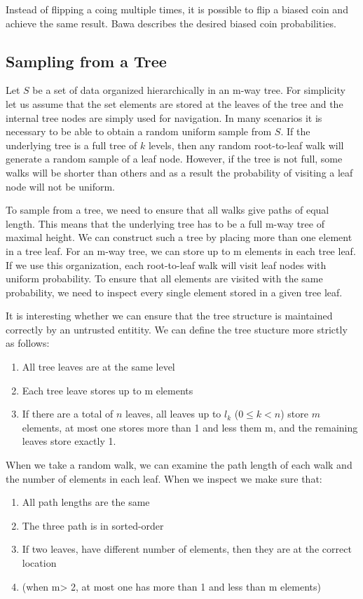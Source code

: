 \documentclass{article}
\begin{document}
Instead of flipping a coing multiple times, it is possible to flip a
biased coin and achieve the same result. Bawa describes the desired
biased coin probabilities.


\subsection{Sampling from a Tree}
Let $S$ be a set of data organized hierarchically in an m-way
tree. For simplicity let us assume that the set elements are stored at
the leaves of the tree and the internal tree nodes are simply used for
navigation. In many scenarios it is necessary to be able to obtain a
random uniform sample from $S$. If the underlying tree is a full tree
of $k$ levels, then any random root-to-leaf walk will generate a
random sample of a leaf node. However, if the tree is not full, some
walks will be shorter than others and as a result the probability of
visiting a leaf node will not be uniform.

To sample from a tree, we need to ensure that all walks give paths of
equal length. This means that the underlying tree has to be a full
m-way tree of maximal height. We can construct such a tree by placing
more than one element in a tree leaf. For an m-way tree, we can store
up to m elements in each tree leaf. If we use this organization, each
root-to-leaf walk will visit leaf nodes with uniform probability. To
ensure that all elements are visited with the same probability, we
need to inspect every single element stored in a given tree leaf.


It is interesting whether we can ensure that the tree structure is
maintained correctly by an untrusted entitity. We can define the tree
stucture more strictly as follows:
\begin{enumerate}
  \item All tree leaves are at the same level
  \item Each tree leave stores up to m elements
  \item If there are a total of $n$ leaves, all leaves up to $l_k$ ($0
  \leq k < n$) store $m$ elements, at most one stores more than 1 and
  less them m, and the remaining leaves store exactly 1.
\end{enumerate}

When we take a random walk, we can examine the path length of each
walk and the number of elements in each leaf. When we inspect we make
sure that:

\begin{enumerate}
  \item All path lengths are the same
  \item The three path is in sorted-order
  \item If two leaves, have different number of elements,  then they
  are at the correct location
  \item (when m> 2, at most one has more than 1 and less than m
  elements)
\end{enumerate}
\end{document}
